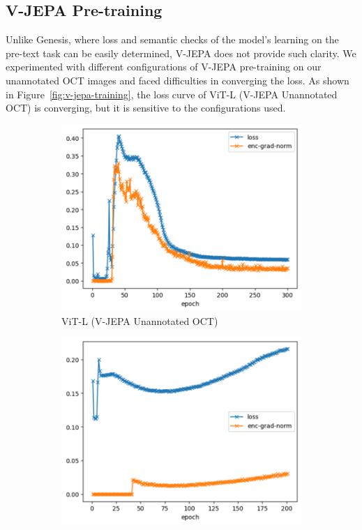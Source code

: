 \documentclass[a4paper,11pt,oneside]{report}
\begin{document}
\subsection{V-JEPA Pre-training}
Unlike Genesis, where loss and semantic checks of the model's learning on the pre-text task can be easily determined, V-JEPA does not provide such clarity. We experimented with different configurations of V-JEPA pre-training on our unannotated OCT images and faced difficulties in converging the loss. As shown in Figure~\ref{fig:v-jepa-training}, the loss curve of ViT-L (V-JEPA Unannotated OCT) is converging, but it is sensitive to the configurations used.

\begin{figure}[hbt]
    \centering
    \begin{subfigure}[t]{0.3\textwidth}
        \centering
        \includegraphics[width=0.9\linewidth]{figures/discussion_vjepa_training_1.png}
        \caption{ViT-L (V-JEPA Unannotated OCT)}
    \end{subfigure}\hfill%
    \begin{subfigure}[t]{0.3\textwidth}
        \centering
        \includegraphics[width=0.9\linewidth]{figures/discussion_vjepa_training_2.png}

\end{subfigure}
\end{figure}
\end{document}

